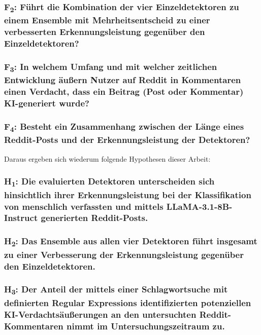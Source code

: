 \hypertarget{rq:2}{
    \subsubsection{F\textsubscript{2}: Führt die Kombination der vier Einzeldetektoren zu einem Ensemble mit Mehrheitsentscheid zu einer verbesserten Erkennungsleistung gegenüber den Einzeldetektoren?}
}

\hypertarget{rq:3}{
    \subsubsection{F\textsubscript{3}: In welchem Umfang und mit welcher zeitlichen Entwicklung äußern Nutzer auf Reddit in Kommentaren einen Verdacht, dass ein Beitrag (Post oder Kommentar) KI-generiert wurde?}
}

\hypertarget{rq:4}{
    \subsubsection{F\textsubscript{4}: Besteht ein Zusammenhang zwischen der Länge eines Reddit-Posts und der Erkennungsleistung der Detektoren?}
}

Daraus ergeben sich wiederum folgende Hypothesen dieser Arbeit:
\hypertarget{hp:1}{
    \subsubsection{H\textsubscript{1}: Die evaluierten Detektoren unterscheiden sich hinsichtlich ihrer Erkennungsleistung bei der Klassifikation von menschlich verfassten und mittels LLaMA-3.1-8B-Instruct generierten Reddit-Posts.}
}

\hypertarget{hp:2}{
    \subsubsection{H\textsubscript{2}: Das Ensemble aus allen vier Detektoren führt insgesamt zu einer Verbesserung der Erkennungsleistung gegenüber den Einzeldetektoren.}
}

\hypertarget{hp:3}{
    \subsubsection{H\textsubscript{3}: Der Anteil der mittels einer Schlagwortsuche mit definierten Regular Expressions identifizierten potenziellen KI-Verdachtsäußerungen an den untersuchten Reddit-Kommentaren nimmt im Untersuchungszeitraum zu.
    }
}

